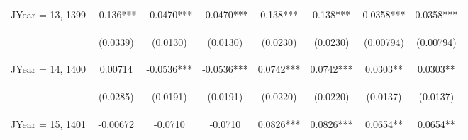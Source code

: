 \documentclass[]{article}
\begin{document}
\begin{center}
\begin{tabular}{lccccccc}
JYear = 13, 1399 & -0.136*** & -0.0470*** & -0.0470*** & 0.138*** & 0.138*** & 0.0358*** & 0.0358*** \\
\vspace{4pt} & \begin{footnotesize}(0.0339)\end{footnotesize} & \begin{footnotesize}(0.0130)\end{footnotesize} & \begin{footnotesize}(0.0130)\end{footnotesize} & \begin{footnotesize}(0.0230)\end{footnotesize} & \begin{footnotesize}(0.0230)\end{footnotesize} & \begin{footnotesize}(0.00794)\end{footnotesize} & \begin{footnotesize}(0.00794)\end{footnotesize} \\
JYear = 14, 1400 & 0.00714 & -0.0536*** & -0.0536*** & 0.0742*** & 0.0742*** & 0.0303** & 0.0303** \\
\vspace{4pt} & \begin{footnotesize}(0.0285)\end{footnotesize} & \begin{footnotesize}(0.0191)\end{footnotesize} & \begin{footnotesize}(0.0191)\end{footnotesize} & \begin{footnotesize}(0.0220)\end{footnotesize} & \begin{footnotesize}(0.0220)\end{footnotesize} & \begin{footnotesize}(0.0137)\end{footnotesize} & \begin{footnotesize}(0.0137)\end{footnotesize} \\
JYear = 15, 1401 & -0.00672 & -0.0710 & -0.0710 & 0.0826*** & 0.0826*** & 0.0654** & 0.0654** \\

\end{tabular}
\end{center}
\end{document}
